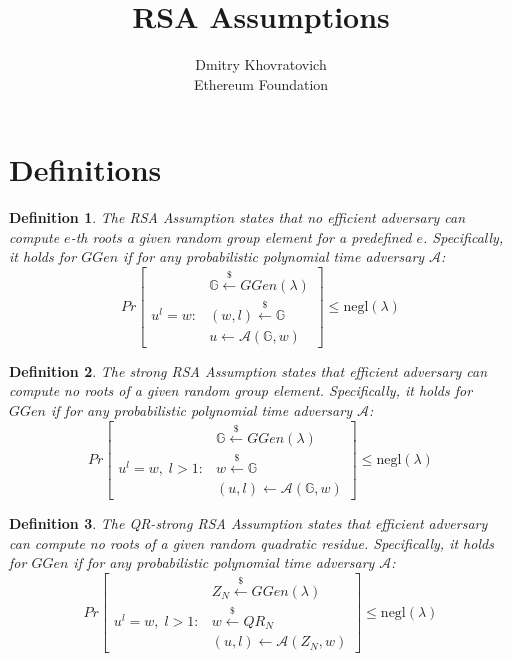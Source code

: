 \documentclass[a4paper]{article}
\title{RSA Assumptions}
\author{Dmitry Khovratovich\\Ethereum Foundation}
\newtheorem{definition}{Definition}
\begin{document}
\maketitle

\section{Definitions}

\begin{definition}
The \emph{RSA Assumption} states that no
efficient adversary can  compute $e$-th roots a given random group element for a predefined $e$. Specifically,
it holds for $GGen$ if for any probabilistic polynomial time adversary $\mathcal{A}$:
$$
Pr
\begin{bmatrix}
&\mathbb{G}\xleftarrow{\$}GGen(\lambda)\\
u^l = w :
& (w,l)\xleftarrow{\$}\mathbb{G}\\
&u \xleftarrow{} \mathcal{A}(\mathbb{G},w)
\end{bmatrix}\leq \mathrm{negl}(\lambda)
$$
\end{definition}

\begin{definition}
The \emph{strong RSA Assumption} states that 
efficient adversary can  compute no roots of a given random group element. Specifically,
it holds for $GGen$ if for any probabilistic polynomial time adversary $\mathcal{A}$:
$$
Pr
\begin{bmatrix}
&\mathbb{G}\xleftarrow{\$}GGen(\lambda)\\
u^l = w,\; l>1 :
& w\xleftarrow{\$}\mathbb{G}\\
&(u,l) \xleftarrow{} \mathcal{A}(\mathbb{G},w)
\end{bmatrix}\leq \mathrm{negl}(\lambda)
$$
\end{definition}

\begin{definition}
The \emph{QR-strong RSA Assumption} states that 
efficient adversary can  compute no roots of a given random quadratic residue. Specifically,
it holds for $GGen$ if for any probabilistic polynomial time adversary $\mathcal{A}$:
$$
Pr
\begin{bmatrix}
&Z_N\xleftarrow{\$}GGen(\lambda)\\
u^l = w,\; l>1 :
& w\xleftarrow{\$}QR_N\\
&(u,l) \xleftarrow{} \mathcal{A}(Z_N,w)
\end{bmatrix}\leq \mathrm{negl}(\lambda)
$$
\end{definition}
\end{document}
